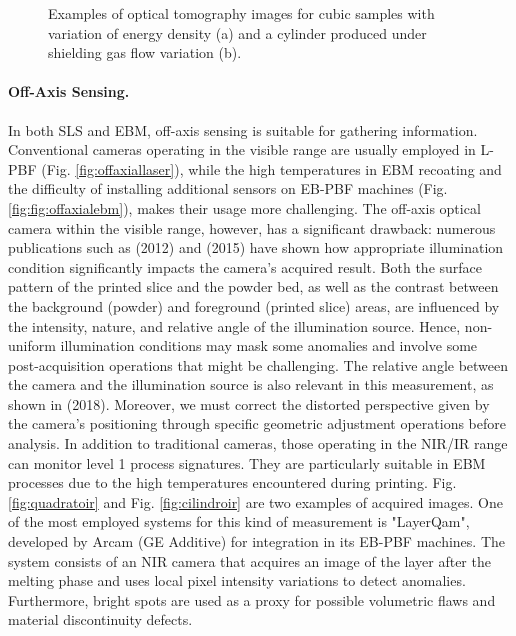 \begin{figure}
{    }
    \caption[Optical tomography examples.]{Examples of optical tomography images for cubic samples with variation of energy density (a) and a cylinder produced under shielding gas flow variation (b)\cite{bamberg_-process_2016}.}
\end{figure}
\paragraph{Off-Axis Sensing.} In both SLS and EBM, off-axis sensing is suitable for gathering information. Conventional cameras operating in the visible range are usually employed in L-PBF (Fig. \ref{fig:offaxiallaser}), while the high temperatures in EBM recoating and the difficulty of installing additional sensors on EB-PBF machines (Fig. \ref{fig:fig:offaxialebm}), makes their usage more challenging. The off-axis optical camera within the visible range, however, has a significant drawback: numerous publications such as \citealt{kleszczynski_error_2012} (2012) and \citeauthor{foster_bk_optical_2015} (2015) have shown how appropriate illumination condition significantly impacts the camera's acquired result. Both the surface pattern of the printed slice and the powder bed, as well as the contrast between the background (powder) and foreground (printed slice) areas, are influenced by the intensity, nature, and relative angle of the illumination source. Hence, non-uniform illumination conditions may mask some anomalies and involve some post-acquisition operations that might be challenging. The relative angle between the camera and the illumination source is also relevant in this measurement, as shown in  \citeauthor{caltanissetta_characterization_2018} (2018). Moreover, we must correct the distorted perspective given by the camera's positioning through specific geometric adjustment operations before analysis. In addition to traditional cameras, those operating in the NIR/IR range can monitor level 1 process signatures. They are particularly suitable in EBM processes due to the high temperatures encountered during printing. Fig. \ref{fig:quadratoir} and Fig. \ref{fig:cilindroir} are two examples of acquired images. One of the most employed systems for this kind of measurement is "LayerQam", developed by Arcam (GE Additive) for integration in its EB-PBF machines. The system consists of an NIR camera that acquires an image of the layer after the melting phase and uses local pixel intensity variations to detect anomalies. Furthermore, bright spots are used as a proxy for possible volumetric flaws and material discontinuity defects.
